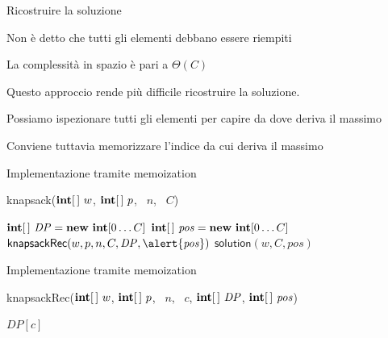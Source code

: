 \begin{frame}{Ricostruire la soluzione}

\vspace{-9pt}
\begin{myboxtitle}[Vantaggi]
\BIL
\item Non è detto che tutti gli elementi debbano essere riempiti
\item La complessità in spazio è pari a $\Theta(C)$
\EIL
\end{myboxtitle}

\begin{myboxtitle}[Svantaggi]
Questo approccio rende più difficile ricostruire la soluzione. 
\BIL
\item Possiamo ispezionare tutti gli elementi per capire da dove 
deriva il massimo
\item Conviene tuttavia memorizzare l'indice da cui deriva il massimo
\EIL
\end{myboxtitle}

\end{frame}

\begin{frame}{Implementazione tramite memoization}

\vspace{-9pt}
\begin{Procedure}
\caption[A]{\textsf{knapsack}($\INTEGER[\,]\ w$, $\INTEGER[\,]\ p$, \INTEGER\ $n$, \INTEGER\ $C$)}
  $\INTEGER[\,]\ \mathit{DP} = \NEW\ \INTEGER[0 \ldots C]$\;
  \alert{$\INTEGER[\,]\ \mathit{pos} = \NEW\ \INTEGER[0 \ldots C]$}\;
  $\textsf{knapsackRec}(w, p, n, C, \mathit{DP}, \alert{\mathit{pos}})$\;
  \Return \alert{$\textsf{solution}(w,C, \mathit{pos})$}\;
\end{Procedure}
\end{frame}



\begin{frame}{Implementazione tramite memoization}

\vspace{-9pt}
\begin{Procedure}
\caption[A]{\textsf{knapsackRec}($\INTEGER[\,]\ w$, $\INTEGER[\,]\ p$, \INTEGER\ $n$, \INTEGER\ $c$, $\INTEGER[\,]\ \mathit{DP}$, \alert{$\INTEGER[\,]\ \mathit{\mathit{pos}}$})}
\Return $\mathit{DP}[c]$\;
\end{Procedure}
\end{frame}

